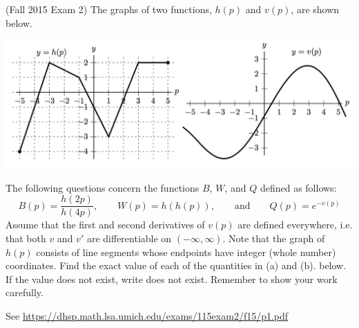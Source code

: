 \documentclass[11pt]{exam}
\begin{document}
\begin{questions}
\begin{solution}
        \end{solution}
\question (Fall 2015 Exam 2) The graphs of two functions, \(h(p)\) and \(v(p)\), are shown below.
  \begin{center}
    \includegraphics[scale=0.5]{Figures/Fall15Exam2p1}
  \end{center}
The following questions concern the functions \(B\), \(W\), and \(Q\) defined as
follows: \[
  B(p) = \frac{h(2p)}{h(4p)}, \qquad W(p) = h(h(p)), \qquad \text{and}\qquad Q(p) = e^{-v(p)}
\]
Assume that the first and second derivatives of \(v(p)\) are defined everywhere, i.e. that both \(v\)
and \(v'\) are differentiable on \((-\infty, \infty)\). Note that the graph of \(h(p)\) consists of line segments
whose endpoints have integer (whole number) coordinates. Find the exact value of each of
the quantities in (a) and (b). below. If the value does not exist, write does not exist.
Remember to show your work carefully.
\begin{solution}
  See \href{https://dhsp.math.lsa.umich.edu/exams/115exam2/f15/p1.pdf}{https://dhsp.math.lsa.umich.edu/exams/115exam2/f15/p1.pdf}
\end{solution}
\end{questions}
\end{document}
